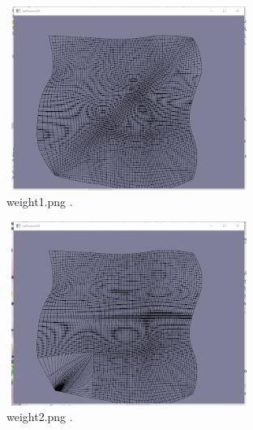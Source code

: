 \documentclass[acmtog]{acmart}
\begin{document}
\begin{figure}[h]
	\centering
	\includegraphics[width=8cm,height=6cm]{weight1.png}
	\caption{weight1.png .}
\end{figure}
\begin{figure}[h]
	\centering
	\includegraphics[width=8cm,height=6cm]{weight2.png}
	\caption{weight2.png .}
\end{figure}
\end{document}
